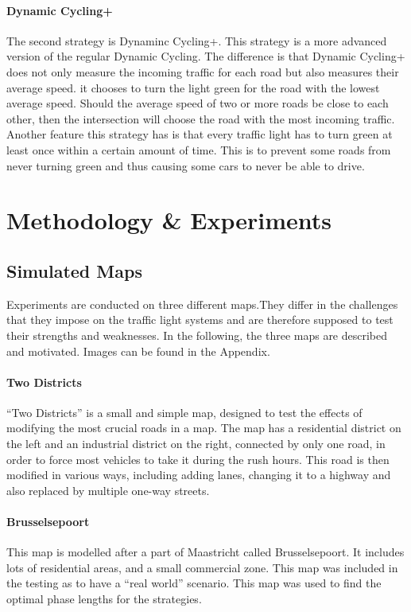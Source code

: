 \documentclass[11pt]{article}
\begin{document}
\paragraph{Dynamic Cycling+} The second strategy is Dynaminc Cycling+. This strategy is a more advanced version of the regular Dynamic Cycling. The difference is that Dynamic Cycling+ does not only measure the incoming traffic for each road but also measures their average speed. it chooses to turn the light green for the road with the lowest average speed. Should the average speed of two or more roads be close to each other, then the intersection will choose the road with the most incoming traffic. Another feature this strategy has is that every traffic light has to turn green at least once within a certain amount of time. This is to prevent some roads from never turning green and thus causing some cars to never be able to drive.

\section{Methodology \& Experiments}
\label{sec:experiments}

\subsection{Simulated Maps}
Experiments are conducted on three different maps.They differ in the challenges that they impose on the traffic light systems and are therefore supposed to test their strengths and weaknesses. In the following, the three maps are described and motivated. Images can be found in the Appendix.

\paragraph{Two Districts} “Two Districts” is a small and simple map, designed to test the effects of modifying the most crucial roads in a map. The map has a residential district on the left and an industrial district on the right, connected by only one road, in order to force most vehicles to take it during the rush hours. This road is then modified in various ways, including adding lanes, changing it to a highway and also replaced by multiple one-way streets. 

\paragraph{Brusselsepoort} This map is modelled after a part of Maastricht called Brusselsepoort. It includes lots of residential areas, and a small commercial zone. This map was included in the testing as to have a “real world” scenario. This map was used to find the optimal phase lengths for the strategies.
\end{document}
